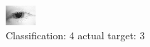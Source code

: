 \begin{figure}[h!]
\begin{center}
\includegraphics[width=0.60\columnwidth]{figures/ID149_class_4_target_3.png}
\end{center}
\caption{ Classification: 4 actual target: 3}
\label{fig:ID149_class_4_target_3}
\end{figure}
